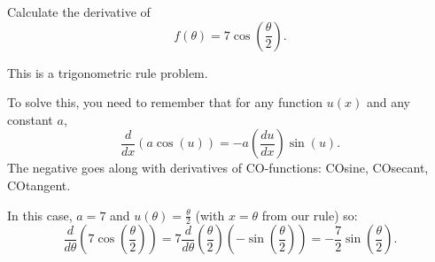 \documentclass{ximera}
\author{Emma Smith Zbarsky}
\begin{document}
\begin{exercise}

Calculate the derivative of
\[f(\theta) = 7\cos\left(\frac{\theta}{2}\right).\]


\begin{hint}
This is a trigonometric rule problem.
\end{hint}


\begin{hint}
To solve this, you need to remember that for any function $u(x)$ and any
constant $a$,
\[\frac{d}{dx}\left(a\cos(u)\right) = -a\left(\frac{du}{dx}\right)\sin(u).\]
The negative goes along with derivatives of CO-functions: COsine,
COsecant, COtangent.

In this case, $a=7$ and $u(\theta) = \frac{\theta}{2}$ (with $x=\theta$
from our rule) so:
\[\frac{d}{d\theta}\left(7\cos\left(\frac{\theta}{2}\right)\right) = 7\frac{d}{d\theta}\left(\frac{\theta}{2}\right)\left(-\sin\left(\frac{\theta}{2}\right)\right) = -\frac{7}{2}\sin\left(\frac{\theta}{2}\right).\]
\end{hint}


\begin{multipleChoice}
\end{multipleChoice}

\end{exercise}
\end{document}
